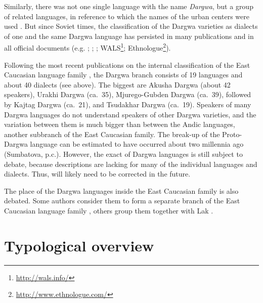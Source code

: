 Similarly, there was not one single language with the name \textit{Dargwa}, but a group of related languages, in reference to which the names of the urban centers were used \citep[1]{Uslar1892}. But since Soviet times, the classification of the Dargwa varieties as dialects of one and the same Dargwa language has persisted in many publications and in all official documents (e.g. ; ; ; WALS\footnote{\url{http://wals.info/}}; Ethnologue\footnote{\url{http://www.ethnologue.com/}}).

Following the most recent publications on the internal classification of the East Caucasian language family \citep{Korjakov2006; Korjakov.Sumbatova2007}, the Dargwa branch consists of 19 languages and about 40 dialects (see  above). The biggest are Akusha Dargwa (about 42 speakers), Urakhi Dargwa (ca.~35), Mjurego-Gubden Dargwa (ca.~39), followed by Kajtag Dargwa (ca.~21), and Tsudakhar Dargwa (ca.~19). Speakers of many Dargwa languages do not understand speakers of other Dargwa varieties, and the variation between them is much bigger than between the Andic languages, another subbranch of the East Caucasian family. The break-up of the Proto-Dargwa language can be estimated to have occurred about two millennia ago (Sumbatova, p.c.). However, the exact  of Dargwa languages is still subject to debate, because descriptions are lacking for many of the individual languages and dialects. Thus,  will likely need to be corrected in the future.

The place of the Dargwa languages inside the East Caucasian family is also debated. Some authors consider them to form a separate branch of the East Caucasian language family \citep[142]{Gigineishvili1977, Kibrik1996}, others group them together with Lak \citep{Haspelmath1993, Korjakov2006, vandenBerg2005}.



\section{Typological overview}
\label{sec:Typological overview}

